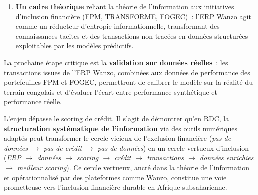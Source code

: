 \documentclass[12pt, a4paper, twocolumn]{article}
\begin{document}
\begin{enumerate}[leftmargin=*]
  \item \textbf{Un cadre théorique} reliant la théorie de l'information aux initiatives d'inclusion financière (FPM, TRANSFORME, FOGEC)~: l'ERP Wanzo agit comme un réducteur d'entropie informationnelle, transformant des connaissances tacites et des transactions non tracées en données structurées exploitables par les modèles prédictifs.
\end{enumerate}

La prochaine étape critique est la \textbf{validation sur données réelles}~: les transactions issues de l'ERP Wanzo, combinées aux données de performance des portefeuilles FPM et FOGEC, permettront de calibrer le modèle sur la réalité du terrain congolais et d'évaluer l'écart entre performance synthétique et performance réelle.

L'enjeu dépasse le scoring de crédit. Il s'agit de démontrer qu'en RDC, la \textbf{structuration systématique de l'information} via des outils numériques adaptés peut transformer le cercle vicieux de l'exclusion financière (\textit{pas de données $\to$ pas de crédit $\to$ pas de données}) en un cercle vertueux d'inclusion (\textit{ERP $\to$ données $\to$ scoring $\to$ crédit $\to$ transactions $\to$ données enrichies $\to$ meilleur scoring}). Ce cercle vertueux, ancré dans la théorie de l'information et opérationnalisé par des plateformes comme Wanzo, constitue une voie prometteuse vers l'inclusion financière durable en Afrique subsaharienne.
\end{document}

